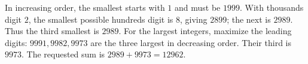 In increasing order, the smallest starts with $1$ and must be $1999$. With thousands digit $2$, the smallest possible hundreds digit is $8$, giving $2899$; the next is $2989$. Thus the third smallest is $2989$. For the largest integers, maximize the leading digits: $9991,9982,9973$ are the three largest in decreasing order. Their third is $9973$. The requested sum is $2989+9973=\boxed{12962}$.
